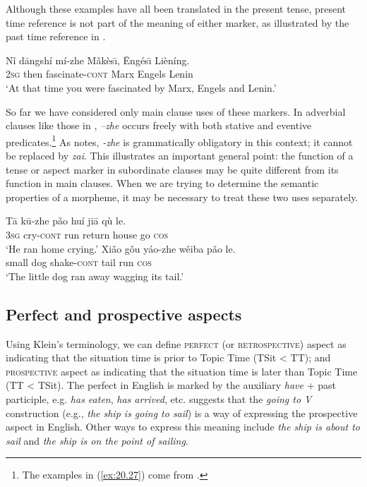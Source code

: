 Although these examples have all been translated in the present tense, present time reference is not part of the meaning of either marker, as illustrated by the past time reference in .


\ea \label{ex:20.26}
\gll Nǐ  dāngshí  mí-zhe  Mǎkès\={\i},  \=Engés\={\i}  Lièníng.\\
\textsc{2sg}  then  fascinate-\textsc{cont}  Marx  Engels  Lenin\\
\glt ‘At that time you were fascinated by Marx, Engels and Lenin.’ 
\z


So far we have considered only main clause uses of these markers. In adverbial clauses like those in , \textit{–zhe} occurs freely with both stative and eventive predicates.\footnote{The examples in (\ref{ex:20.27}) come from \citet[223]{LiThompson1981}.} As \citet[275]{Smith1997} notes, \textit{-zhe} is grammatically obligatory in this context; it cannot be replaced by \textit{zai}. This illustrates an important general point: the function of a tense or aspect marker in subordinate clauses may be quite different from its function in main clauses. When we are trying to determine the semantic properties of a morpheme, it may be necessary to treat these two uses separately.


\ea \label{ex:20.27}
\ea  \gll Tā  k\=u-zhe  pǎo  huí  jiā  qù  le.\\
\textsc{3sg}  cry-\textsc{cont}  run  return  house  go  \textsc{cos}\\
\glt ‘He ran home crying.’ 
\ex \gll  Xiǎo  gǒu  yáo-zhe  wěiba  pǎo  le.\\
small  dog  shake-\textsc{cont}  tail  run  \textsc{cos}\\
\glt ‘The little dog ran away wagging its tail.’ 
\z \z

\subsection{Perfect and prospective aspects}\label{sec:20.4.3}

Using Klein’s terminology, we can define \textsc{perfect} (or \textsc{retrospective}) aspect as indicating that the situation time is prior to Topic Time (TSit < TT); and \textsc{prospective} aspect as indicating that the situation time is later than Topic Time (TT < TSit). The perfect in English is marked by the auxiliary \textit{have} + past participle, e.g. \textit{has eaten}, \textit{has arrived}, etc. \citet[64]{Comrie1976} suggests that the \textit{going to V} construction (e.g., \textit{the ship is going to sail}) is a way of expressing the prospective aspect in English. Other ways to express this meaning include \textit{the ship is about to sail} and \textit{the ship is on the point of sailing}.



